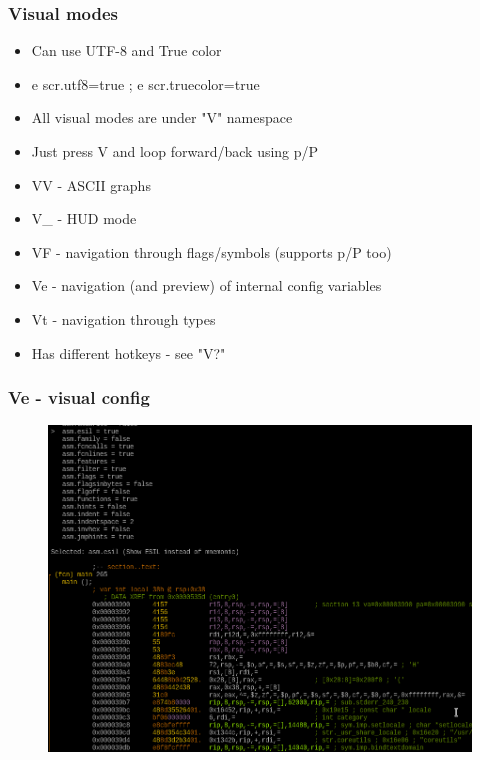 \documentclass[10pt,pdf,utf8,english,compress,hyperref={unicode}]{beamer}
\begin{document}
\begin{frame}[fragile]
  \frametitle{Visual modes}
  \begin{itemize}
	  \item Can use UTF-8 and True color %
	  \item e scr.utf8=true ; e scr.truecolor=true
	  \item All visual modes are under "V" namespace
	  \item Just press V and loop forward/back using p/P
	  \item VV - ASCII graphs
	  \item V\_ - HUD mode
	  \item VF - navigation through flags/symbols (supports p/P too)
	  \item Ve - navigation (and preview) of internal config variables
	  \item Vt - navigation through types
	  \item Has different hotkeys - see "V?"
  \end{itemize}
\end{frame}

\begin{frame}[fragile]
	\frametitle{Ve - visual config}
	\begin{figure}
		\includegraphics[width=\linewidth]{r2visualconfig.png}
	\end{figure}
\end{frame}
\end{document}
